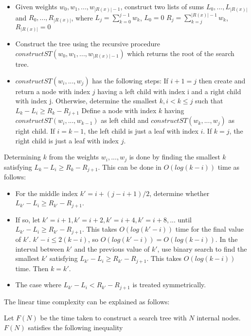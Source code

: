 \begin{itemize}
	\item Given weights ${w_0, w_1, ..., w_{|R(x)|-1}}$, construct two lists of sums ${L_0, ..., L_{|R(x)|}}$ and ${R_0, ..., R_{|R(x)|}}$, where
	\subitem $L_j=\sum_{k=0}^{j-1} w_k$, $L_0=0$
	\subitem $R_j=\sum_{k=j}^{|R(x)|-1} w_k$, $R_{|R(x)|}=0$
	\item Construct the tree using the recursive procedure $constructST(w_0, w_1, ..., w_{|R(x)|-1})$ which returns the root of the search tree.
	\item $constructST(w_i, ..., w_j)$ has the following steps:
	\subitem If $i+1=j$ then create and return a node with index $j$ having a left child with index i and a right child with index j.
	\subitem Otherwise, determine the smallest $k, i<k\le j$ such that
	\subsubitem $L_k-L_i \ge R_k-R_{j+1}$
	\subitem Define a node with index $k$ having $constructST(w_i, ..., w_{k-1})$ as left child and $constructST(w_k, ..., w_j)$ as right child.
	\subsubitem If $i=k-1$, the left child is just a leaf with index $i$.
	\subsubitem If $k=j$, the right child is just a leaf with index $j$.
\end{itemize}

Determining $k$ from the weights ${w_i, ..., w_j}$ is done by finding the smallest $k$ satisfying $L_k-L_i \ge R_k-R_{j+1}$. This can be done in $O(log(k-i))$ time as follows:

\begin{itemize}
	\item For the middle index $k'=i+(j-i+1)/2$, determine whether $L_{k'}-L_i \ge R_{k'}-R_{j+1}$.
	\item If so, let $k'=i+1, k'=i+2, k'=i+4, k'=i+8, ...$ until $L_{k'}-L_i \ge R_{k'}-R_{j+1}$.
	\subsubitem This takes $O(log(k'-i))$ time for the final value of $k'$.
	\subsubitem $k'-i \le 2(k-i)$, so $O(log(k'-i)) = O(log(k-i))$.
	\subitem In the interval between $k'$ and the previous value of $k'$, use binary search to find the smallest $k'$ satisfying $L_{k'}-L_i \ge R_{k'}-R_{j+1}$.
	\subsubitem This takes $O(log(k-i))$ time.
	\subitem Then $k=k'$.
	\item The case where $L_{k'}-L_i < R_{k'}-R_{j+1}$ is treated symmetrically.\\
\end{itemize}
The linear time complexity can be explained as follows:

Let $F(N)$ be the time taken to construct a search tree with $N$ internal nodes. $F(N)$ satisfies the following inequality

